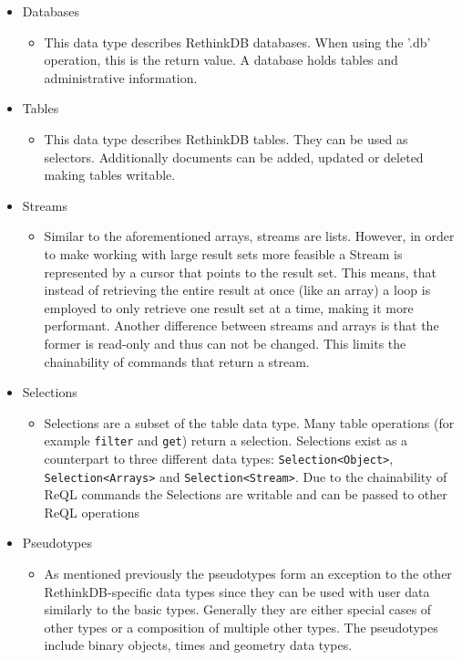 \begin{itemize}
    \item Databases
    \begin{itemize}
        \item This data type describes RethinkDB databases. When using the '.db' operation, this is the return value. A database holds tables and administrative information.
    \end{itemize}
    \item Tables
    \begin{itemize}
        \item This data type describes RethinkDB tables. They can be used as selectors. Additionally documents can be added, updated or deleted making tables writable.
    \end{itemize}
    \item Streams
    \begin{itemize}
        \item Similar to the aforementioned arrays, streams are lists. However, in order to make working with large result sets more feasible a Stream is represented by a cursor that points to the result set. This means, that instead of retrieving the entire result at once (like an array) a loop is employed to only retrieve one result set at a time, making it more performant. Another difference between streams and arrays is that the former is read-only and thus can not be changed. This limits the chainability of commands that return a stream.
    \end{itemize}
    \item Selections
    \begin{itemize}
        \item Selections are a subset of the table data type. Many table operations (for example \texttt{filter} and \texttt{get}) return a selection. Selections exist as a counterpart to three different data types: \texttt{Selection<Object>}, \texttt{Selection<Arrays>} and \texttt{Selection<Stream>}. Due to the chainability of ReQL commands the Selections are writable and can be passed to other ReQL operations
    \end{itemize}
    \item Pseudotypes
    \begin{itemize}
        \item As mentioned previously the pseudotypes form an exception to the other RethinkDB-specific data types since they can be used with user data similarly to the basic types. Generally they are either special cases of other types or a composition of multiple other types. The pseudotypes include binary objects, times and geometry data types.
    \end{itemize}
\end{itemize}

